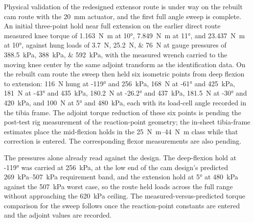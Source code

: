 \documentclass[utf8]{FrontiersinHarvard} %
\begin{document}
Physical validation of the redesigned extensor route is under way on the rebuilt cam route with the \qty{20}{\mm} actuator, and the first full angle sweep is complete. An initial three-point hold near full extension on the earlier direct route measured knee torque of \qty{1.163}{\newton\meter} at \ang{10}, \qty{7.849}{\newton\meter} at \ang{11}, and \qty{23.437}{\newton\meter} at \ang{10}, against hung loads of \qtylist{3.7;25.2;76}{\newton} at gauge pressures of \qtylist{388.5;388;592}{\kPa}, with the measured wrench carried to the moving knee center by the same adjoint transform as the identification data. On the rebuilt cam route the sweep then held six isometric points from deep flexion to extension: \qty{116}{\newton} hung at \ang{-119} and \qty{256}{\kPa}, \qty{168}{\newton} at \ang{-61} and \qty{425}{\kPa}, \qty{181}{\newton} at \ang{-43} and \qty{435}{\kPa}, \qty{180.2}{\newton} at \ang{-26.2} and \qty{437}{\kPa}, \qty{181.5}{\newton} at \ang{-30} and \qty{420}{\kPa}, and \qty{100}{\newton} at \ang{5} and \qty{480}{\kPa}, each with its load-cell angle recorded in the tibia frame. The adjoint torque reduction of these six points is pending the post-test rig measurement of the reaction-point geometry; the in-sheet tibia-frame estimates place the mid-flexion holds in the \qtyrange{25}{44}{\newton\meter} class while that correction is entered. The corresponding flexor measurements are also pending.

The pressures alone already read against the design. The deep-flexion hold at \ang{-119} was carried at \qty{256}{\kPa}, at the low end of the cam design's predicted \qtyrange{269}{507}{\kPa} requirement band, and the extension hold at \ang{5} at \qty{480}{\kPa} against the \qty{507}{\kPa} worst case, so the route held loads across the full range without approaching the \qty{620}{\kPa} ceiling. The measured-versus-predicted torque comparison for the sweep follows once the reaction-point constants are entered and the adjoint values are recorded.
\end{document}
